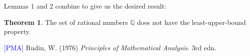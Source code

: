 \documentclass[12pt]{article}
\theoremstyle{definition}
\newtheorem{theorem}{Theorem}
\begin{document}
Lemmas 1 and 2 combine to give us the desired result:

\begin{theorem}

The set of rational numbers \( \mathbb{Q} \) does not have the least-upper-bound property.

\end{theorem}

\hrulefill

\hypertarget{pma}{\textcolor{blue}{[PMA]} Rudin, W. (1976) \textit{Principles of Mathematical Analysis.} 3rd edn.}
\end{document}
